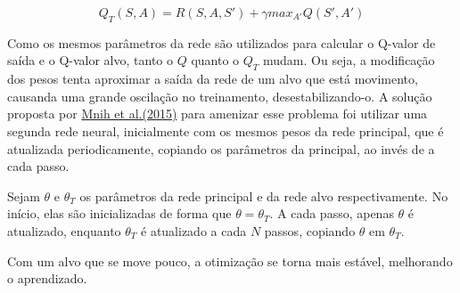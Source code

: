 \begin{equation} \label{eq:q_target}
Q_{T}(S,A) = R(S,A,S') + \gamma max_{A'}Q(S',A')
\end{equation}


Como os mesmos parâmetros da rede são utilizados para calcular o Q-valor de saída e o Q-valor alvo, tanto o $Q$ quanto o $Q_{T}$ mudam.
Ou seja, a modificação dos pesos tenta aproximar a saída da rede de um alvo que está movimento, causanda uma grande oscilação no treinamento, desestabilizando-o.
A solução proposta por \hyperlink{Mni+15}{Mnih et al.(2015)} para amenizar esse problema foi utilizar uma segunda rede neural, inicialmente com os mesmos pesos da rede principal, que é atualizada periodicamente, copiando os parâmetros da principal, ao invés de a cada passo.

Sejam $\theta$ e $\theta_{T}$ os parâmetros da rede principal e da rede alvo respectivamente.
No início, elas são inicializadas de forma que $\theta = \theta_{T}$.
A cada passo, apenas $\theta$ é atualizado, enquanto $\theta_{T}$ é atualizado a cada $N$ passos, copiando $\theta$ em $\theta_{T}$.

Com um alvo que se move pouco, a otimização se torna mais estável, melhorando o aprendizado.


